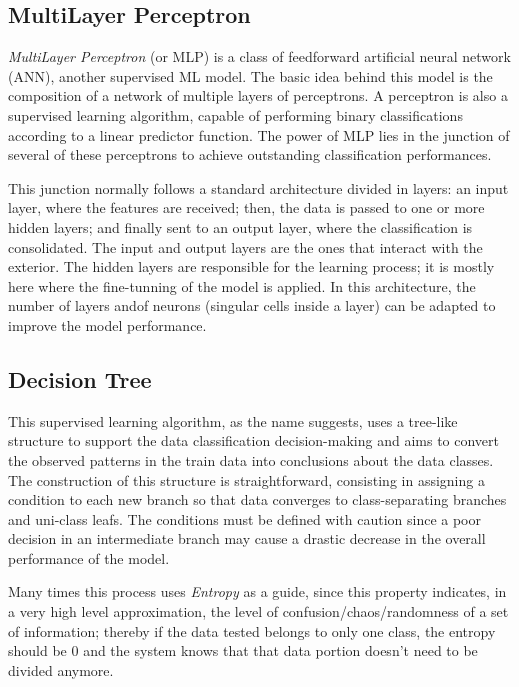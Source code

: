 \documentclass[extendedabs]{recpad2k}
\begin{document}
\subsection{MultiLayer Perceptron}

\textit{MultiLayer Perceptron} (or MLP) is a class of feedforward artificial neural network (ANN), another supervised ML model. 
The basic idea behind this model is the composition of a network of multiple layers of perceptrons.
A perceptron is also a supervised learning algorithm, capable of performing binary classifications according to a linear predictor function. 
The power of MLP lies in the junction of several of these perceptrons to achieve outstanding classification performances.

This junction normally follows a standard architecture divided in layers: 
an input layer, where the features are received;
then, the data is passed to one or more hidden layers;
and finally sent to an output layer, where the classification is consolidated. 
The input and output layers are the ones that interact with the exterior.
The hidden layers are responsible for the learning process; it is mostly here where the fine-tunning of the model is applied. 
In this architecture, the number of layers andof neurons (singular cells inside a layer) can be adapted to improve the model performance.

\subsection{Decision Tree} 

This supervised learning algorithm, as the name suggests, uses a tree-like structure to support the data classification decision-making and aims to convert the 
observed patterns in the train data into conclusions about the data classes. 
The construction of this structure is straightforward, consisting in assigning a condition to each new branch so that data converges to class-separating branches 
and uni-class leafs.
The conditions must be defined with caution since a poor decision in an intermediate branch may cause a drastic decrease in the overall performance of the model. 

Many times this process uses \textit{Entropy} as a guide, since this property indicates, in a very high level approximation, the level of 
confusion/chaos/randomness of a set of information; 
thereby if the data tested belongs to only one class, the entropy should be 0 and the system knows that that data portion doesn't need to be divided anymore.
\end{document}
